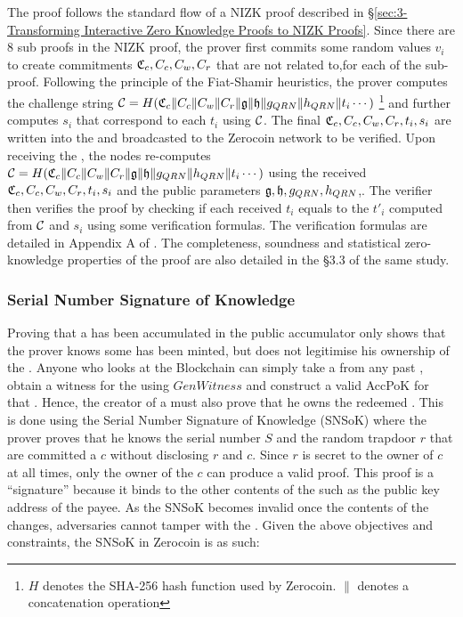 The proof follows the standard flow of a NIZK proof described in \S\ref{sec:3-Transforming Interactive Zero Knowledge Proofs to NIZK Proofs}. Since there are 8 sub proofs in the NIZK proof, the prover first commits some random values $v_i$ to create commitments $\mathfrak{C}_c,C_c,C_w,C_r$ that are not related to,for each of the sub-proof. Following the principle of the Fiat-Shamir heuristics, the prover computes the challenge string $\mathcal{C}=H(\mathfrak{C}_c \| C_c \| C_w \| C_r \| \mathfrak{g} \| \mathfrak{h} \| g_{QRN} \| h_{QRN} \| t_i \cdots)$ \footnote{$H$ denotes the SHA-256 hash function used by Zerocoin. $\|$ denotes a concatenation operation} and further computes $s_i$ that correspond to each $t_i$ using $\mathcal{C}$. The final $\mathfrak{C}_c,C_c,C_w,C_r,t_i,s_i$ are written into the  and broadcasted to the Zerocoin network to be verified. Upon receiving the , the nodes re-computes $\mathcal{C}=H(\mathfrak{C}_c \| C_c \| C_w \| C_r \| \mathfrak{g} \| \mathfrak{h} \| g_{QRN} \| h_{QRN} \| t_i \cdots)$ using the received $\mathfrak{C}_c,C_c,C_w,C_r,t_i,s_i$ and the public parameters $\mathfrak{g},\mathfrak{h},g_{QRN},h_{QRN}$,. The verifier then verifies the proof by checking if each received $t_i$ equals to the $t'_i$ computed from $\mathcal{C}$ and $s_i$ using some verification formulas. The verification formulas are detailed in Appendix A of \cite{JanCamenisch12002}. The completeness, soundness and statistical zero-knowledge properties of the proof are also detailed in the \S3.3 of the same study.

\subsubsection{Serial Number Signature of Knowledge}
\label{sec:3-Serial Number Signature of Knowledge}
Proving that a \kwCoin{} has been accumulated in the public accumulator only shows that the prover knows some \kwCoin{} has been minted, but does not legitimise his ownership of the \kwCoin{}. Anyone who looks at the Blockchain can simply take a \kwCoin{} from any past , obtain a witness for the \kwCoin{} using $GenWitness$ and construct a valid AccPoK for that \kwCoin{}. Hence, the creator of a  must also prove that he owns the redeemed \kwCoin{}. This is done using the Serial Number Signature of Knowledge (SNSoK) where the prover proves that he knows the serial number $S$ and the random trapdoor $r$ that are committed a \kwCoin{} $c$ without disclosing $r$ and $c$. Since $r$ is secret to the owner of $c$ at all times, only the owner of the $c$ can produce a valid proof. This proof is a “signature” because it binds to the other contents of the  such as the public key address of the payee. As the SNSoK becomes invalid once the contents of the  changes, adversaries cannot tamper with the . Given the above objectives and constraints, the SNSoK in Zerocoin is as such:

